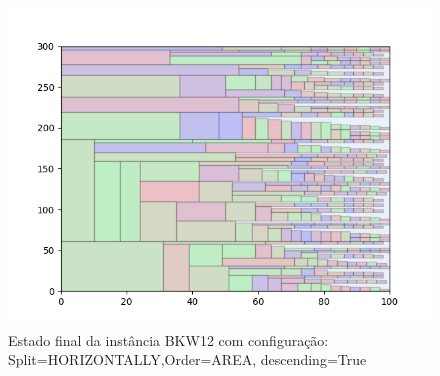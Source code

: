 \begin{figure}[H]
    \centering
    \caption[]{Estado final da instância BKW12 com configuração: Split=HORIZONTALLY,Order=AREA, descending=True}
    \label{fig:bkw12-horizontally-area-true}
    \includegraphics[scale=0.5]{output/figures/bkw/bkw12/horizontally/area/true/000}
\end{figure}